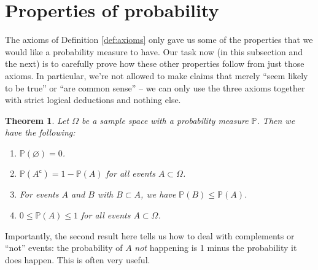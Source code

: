 \documentclass[
  a4paper,
]{book}
\providecommand{\tightlist}{%
  \setlength{\itemsep}{0pt}\setlength{\parskip}{0pt}}
\newtheorem{theorem}{Theorem}[chapter]
\theoremstyle{definition}
\theoremstyle{definition}
\theoremstyle{definition}
\theoremstyle{definition}
\theoremstyle{remark}
\begin{document}
\hypertarget{prob-properties}{%
\section{Properties of probability}\label{prob-properties}}

The axioms of Definition \ref{def:axioms} only gave us some of the properties that we would like a probability measure to have. Our task now (in this subsection and the next) is to carefully prove how these other properties follow from just those axioms. In particular, we're not allowed to make claims that merely ``seem likely to be true'' or ``are common sense'' -- we can only use the three axioms together with strict logical deductions and nothing else.

\begin{theorem}

Let \(\Omega\) be a sample space with a probability measure \(\mathbb P\). Then we have the following:

\begin{enumerate}
\def\labelenumi{\arabic{enumi}.}
\tightlist
\item
  \(\mathbb P(\varnothing) = 0\).
\item
  \(\mathbb P(A^\mathsf{c}) = 1 - \mathbb P(A)\) for all events \(A \subset \Omega\).
\item
  For events \(A\) and \(B\) with \(B \subset A\), we have \(\mathbb P(B) \leq \mathbb P(A)\).
\item
  \(0 \leq \mathbb P(A) \leq 1\) for all events \(A \subset \Omega\).
\end{enumerate}

\end{theorem}

Importantly, the second result here tells us how to deal with complements or ``not'' events: the probability of \(A\) \emph{not} happening is 1 minus the probability it does happen. This is often very useful.
\end{document}
